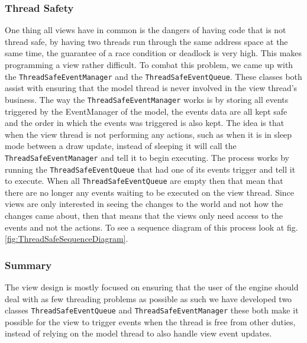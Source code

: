 \subsubsection{Thread Safety}

One thing all views have in common is the dangers of having code that
is not thread safe, by having two threads run through the same address
space at the same time, the guarantee of a race condition or deadlock
is very high. This makes programming a view rather difficult. To combat
this problem, we came up with the \texttt{ThreadSafeEventManager}
and the \texttt{ThreadSafeEventQueue}. These classes both assist with
ensuring that the model thread is never involved in the view thread\textquoteright{}s
business. The way the \texttt{ThreadSafeEventManager} works is by
storing all events triggered by the EventManager of the model, the
events data are all kept safe and the order in which the events was
triggered is also kept. The idea is that when the view thread is not
performing any actions, such as when it is in sleep mode between a
draw update, instead of sleeping it will call the \texttt{ThreadSafeEventManager}
and tell it to begin executing. The process works by running the \texttt{ThreadSafeEventQueue}
that had one of its events trigger and tell it to execute. When all
\texttt{ThreadSafeEventQueue} are empty then that mean that there
are no longer any events waiting to be executed on the view thread.
Since views are only interested in seeing the changes to the world
and not how the changes came about, then that means that the views
only need access to the events and not the actions. To see a sequence
diagram of this process look at fig. \ref{fig:ThreadSafeSequenceDiagram}.


\subsubsection{Summary}

The view design is mostly focused on ensuring that the user of the
engine should deal with as few threading problems as possible as such
we have developed two classes \texttt{ThreadSafeEventQueue} and \texttt{ThreadSafeEventManager}
these both make it possible for the view to trigger events when the
thread is free from other duties, instead of relying on the model
thread to also handle view event updates. 
